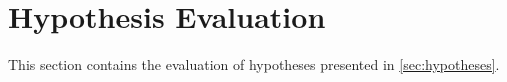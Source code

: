 \section{Hypothesis Evaluation}
\label{sec:hypothesis_evaluation}

This section contains the evaluation of hypotheses presented in \autoref{sec:hypotheses}.



